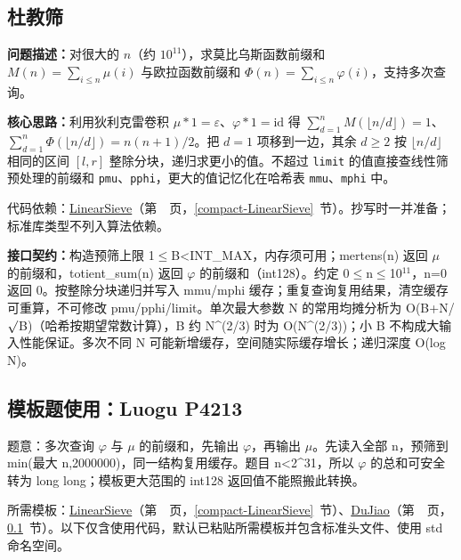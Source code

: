 \subsection{杜教筛}\label{compact-DuJiao}

\noindent\textbf{问题描述：}\allowbreak 对很大的 $n$（约 $10^{11}$），求莫比乌斯函数前缀和 $M(n)=\sum_{i\le n}\mu(i)$ 与欧拉函数前缀和 $\Phi(n)=\sum_{i\le n}\varphi(i)$，支持多次查询。

\textbf{核心思路：}\allowbreak 利用狄利克雷卷积 $\mu*1=\varepsilon$、$\varphi*1=\mathrm{id}$ 得 $\sum_{d=1}^{n}M(\lfloor n/d\rfloor)=1$、$\sum_{d=1}^{n}\Phi(\lfloor n/d\rfloor)=n(n+1)/2$。把 $d=1$ 项移到一边，其余 $d\ge2$ 按 $\lfloor n/d\rfloor$ 相同的区间 $[l,r]$ 整除分块，递归求更小的值。不超过 \texttt{limit} 的值直接查线性筛预处理的前缀和 \texttt{pmu}、\texttt{pphi}，更大的值记忆化在哈希表 \texttt{mmu}、\texttt{mphi} 中。

代码依赖：\hyperref[compact-LinearSieve]{LinearSieve}（第~\pageref{compact-LinearSieve}~页，\ref{compact-LinearSieve}~节）。抄写时一并准备；标准库类型不列入算法依赖。

{\sloppy{}\noindent\textbf{接口契约：}构造预筛上限 1$\le$B<INT\_MAX，内存须可用；mertens(n) 返回 $\mu$ 的前缀和，totient\_sum(n) 返回 $\varphi$ 的前缀和（int128）。约定 0$\le$n$\le$10$^{11}$，n=0 返回 0。按整除分块递归并写入 mmu/mphi 缓存；重复查询复用结果，清空缓存可重算，不可修改 pmu/pphi/limit。单次最大参数 N 的常用均摊分析为 O(B+N/$\sqrt{\vphantom x}$B)（哈希按期望常数计算），B 约 N\textasciicircum{}(2/3) 时为 O(N\textasciicircum{}(2/3))；小 B 不构成大输入性能保证。多次不同 N 可能新增缓存，空间随实际缓存增长；递归深度 O(log N)。\par}



\Needspace{325pt}

\subsection*{模板题使用：Luogu P4213}

\label{usage-example-85}

题意：多次查询 $\varphi$ 与 $\mu$ 的前缀和，先输出 $\varphi$，再输出 $\mu$。先读入全部 n，预筛到 min(最大 n,2000000)，同一结构复用缓存。题目 n<2\textasciicircum{}31，所以 $\varphi$ 的总和可安全转为 long long；模板更大范围的 int128 返回值不能照搬此转换。

所需模板：\hyperref[compact-LinearSieve]{LinearSieve}（第~\pageref{compact-LinearSieve}~页，\ref{compact-LinearSieve}~节）、\hyperref[compact-DuJiao]{DuJiao}（第~\pageref{compact-DuJiao}~页，\ref{compact-DuJiao}~节）。以下仅含使用代码，默认已粘贴所需模板并包含标准头文件、使用 std 命名空间。

